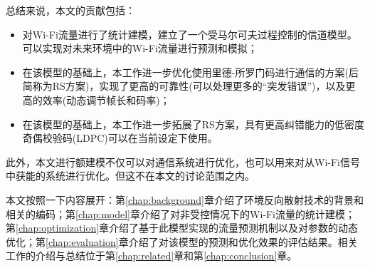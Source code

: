 
总结来说，本文的贡献包括：

\begin{itemize}
	\item 对Wi-Fi流量进行了统计建模，建立了一个受马尔可夫过程控制的信道模型。可以实现对未来环境中的Wi-Fi流量进行预测和模拟；
	
	\item 在该模型的基础上，本工作进一步优化使用里德-所罗门码进行通信的方案(后简称为RS方案)，实现了更高的可靠性(可以处理更多的“突发错误”)，以及更高的效率(动态调节帧长和码率)；
	
	\item 在该模型的基础上，本工作进一步拓展了RS方案，具有更高纠错能力的低密度奇偶校验码(LDPC)可以在当前设定下使用。
\end{itemize}

此外，本文进行额建模不仅可以对通信系统进行优化，也可以用来对从Wi-Fi信号中获能的系统进行优化。但这不在本文的讨论范围之内。

本文按照一下内容展开：第\ref{chap:background}章介绍了环境反向散射技术的背景和相关的编码；第\ref{chap:model}章介绍了对非受控情况下的Wi-Fi流量的统计建模；第\ref{chap:optimization}章介绍了基于此模型实现的流量预测机制以及对参数的动态优化；第\ref{chap:evaluation}章介绍了对该模型的预测和优化效果的评估结果。相关工作的介绍与总结位于第\ref{chap:related}章和第\ref{chap:conclusion}章。
